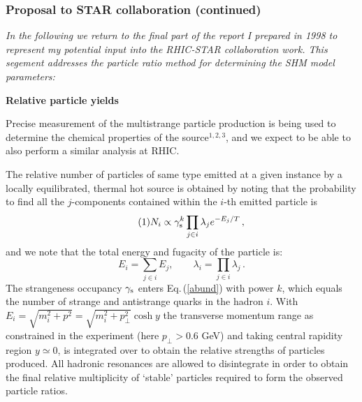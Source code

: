 \subsubsection{Proposal to STAR collaboration (continued)}
\noindent\textit{In the following we return to the final part of the report I prepared in 1998 to represent my potential input into the RHIC-STAR collaboration work. This segement addresses the particle ratio method for determining the SHM model parameters:} \\[-0.7cm]
%
\begin{mdframed}[linecolor=gray,roundcorner=12pt,backgroundcolor=Dandelion!15,linewidth=1pt,leftmargin=0cm,rightmargin=0cm,topline=true,bottomline=true,skipabove=12pt]\relax%
\label{SHM-STAR}
\textbf{Relative particle yields}\\
Precise measurement of the multistrange particle
production is being used to determine the chemical properties of
the source$^{1,2,3}$, and we expect to be able to
also perform a similar analysis at RHIC. 

The relative number of particles of same type 
emitted at a given instance by a locally equilibrated, 
thermal hot source is obtained by
noting that the probability to find all the $j$-components
contained within the $i$-th emitted particle is
\begin{equation}\tag{1}\label{abund}
N_i\propto \gamma_{\rm s}^k\prod_{j\in i}\lambda_je^{-E_j/T}\,,
\end{equation}
and we note that the total energy and fugacity of the particle is:
\begin{equation}\tag{2}
E_i=\sum_{j\in i}E_j,\qquad \lambda_i=\prod_{j\in i}\lambda_j\,.
\end{equation}
The strangeness occupancy $\gamma_{\rm s}$ enters
Eq.\,(\ref{abund}) with power $k$, which equals the number of
strange and antistrange quarks in the hadron $i$. 
With $E_i=\sqrt{m_i^2+p^2}=\sqrt{m_i^2+p_\bot^2}\cosh y $ 
the transverse momentum range 
as constrained in the experiment (here $p_\bot>0.6 $ GeV)
and taking central rapidity region $y\simeq 0$, is integrated 
over to obtain the relative strengths of particles produced. All
hadronic resonances are allowed to disintegrate 
in order to obtain the final relative multiplicity of `stable'
particles required to form the observed particle ratios. 


\end{mdframed}
